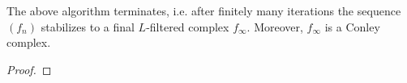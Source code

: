 \begin{thm}
The above algorithm terminates, i.e. after finitely many iterations the sequence $(f_n)$ stabilizes to a final $L$-filtered complex $f_\infty$.  Moreover, $f_\infty$ is a Conley complex.
\end{thm}
\begin{proof}

\end{proof}





